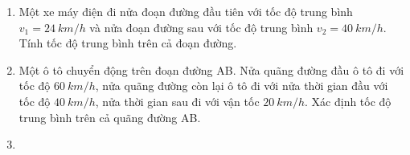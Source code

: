 \begin{enumerate}[label=\bfseries Bài \arabic*:]
{	}
	\item {}
	
	{
		Một xe máy điện đi nửa đoạn đường đầu tiên với tốc độ trung bình $v_1 = \SI{24}{km/h}$ và nửa đoạn đường sau với tốc độ trung bình $v_2 = \SI{40}{km/h}$. Tính tốc độ trung bình trên cả đoạn đường.
		
	}
	\item {}
	
	{
		
		Một ô tô chuyển động trên đoạn đường AB. Nửa quãng đường đầu ô tô đi với tốc độ $\SI{60}{km/h}$, nửa quãng đường còn lại ô tô đi với nửa thời gian đầu với tốc độ $\SI{40}{km/h}$, nửa thời gian sau đi với vận tốc $\SI{20}{km/h}$. Xác định tốc độ trung bình trên cả quãng đường AB.
	}
	\item {}
	
	{
		
}
\end{enumerate}
